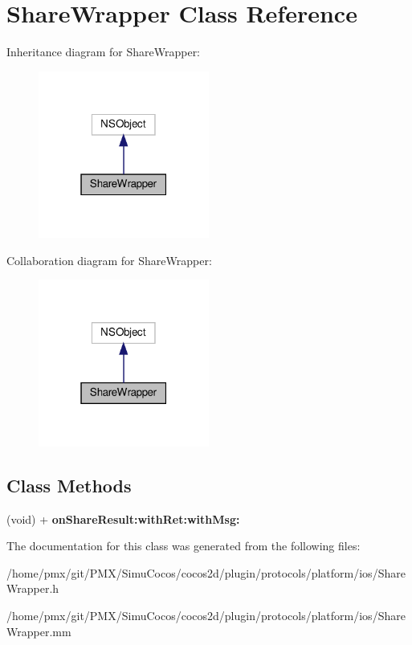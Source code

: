 \hypertarget{interfaceShareWrapper}{}\section{Share\+Wrapper Class Reference}
\label{interfaceShareWrapper}


Inheritance diagram for Share\+Wrapper\+:
\nopagebreak
\begin{figure}[H]
\begin{center}
\leavevmode
\includegraphics[width=159pt]{interfaceShareWrapper__inherit__graph}
\end{center}
\end{figure}


Collaboration diagram for Share\+Wrapper\+:
\nopagebreak
\begin{figure}[H]
\begin{center}
\leavevmode
\includegraphics[width=159pt]{interfaceShareWrapper__coll__graph}
\end{center}
\end{figure}
\subsection*{Class Methods}
\begin{DoxyCompactItemize}
\item 
\mbox{\label{interfaceShareWrapper_af848e691cb180dd96b63297fcdb11f14}} 
(void) + {\bfseries on\+Share\+Result\+:with\+Ret\+:with\+Msg\+:}
\end{DoxyCompactItemize}


The documentation for this class was generated from the following files\+:\begin{DoxyCompactItemize}
\item 
/home/pmx/git/\+P\+M\+X/\+Simu\+Cocos/cocos2d/plugin/protocols/platform/ios/Share\+Wrapper.\+h\item 
/home/pmx/git/\+P\+M\+X/\+Simu\+Cocos/cocos2d/plugin/protocols/platform/ios/Share\+Wrapper.\+mm\end{DoxyCompactItemize}
